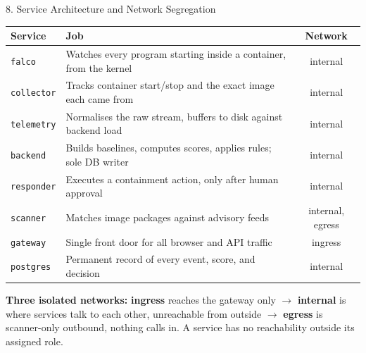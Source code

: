 \documentclass[aspectratio=169, 11pt]{beamer}
\renewcommand{\arraystretch}{1.15}
\begin{document}
\begin{frame}{8. Service Architecture and Network Segregation}
    \scriptsize
    \begin{table}
        \centering
        \renewcommand{\arraystretch}{1.12}
        \setlength{\tabcolsep}{3pt}
        \begin{tabular}{l p{7.6cm} c}
            \toprule
            \textbf{Service} & \textbf{Job} & \textbf{Network} \\
            \midrule
            \texttt{falco} & Watches every program starting inside a container, from the kernel & internal \\
            \texttt{collector} & Tracks container start/stop and the exact image each came from & internal \\
            \texttt{telemetry} & Normalises the raw stream, buffers to disk against backend load & internal \\
            \texttt{backend} & Builds baselines, computes scores, applies rules; sole DB writer & internal \\
            \texttt{responder} & Executes a containment action, only after human approval & internal \\
            \texttt{scanner} & Matches image packages against advisory feeds & internal, egress \\
            \texttt{gateway} & Single front door for all browser and API traffic & ingress \\
            \texttt{postgres} & Permanent record of every event, score, and decision & internal \\
            \bottomrule
        \end{tabular}
    \end{table}
    \vspace{0.1cm}
    \textbf{Three isolated networks:} \textbf{ingress} reaches the gateway only $\to$ \textbf{internal} is where services talk to each other, unreachable from outside $\to$ \textbf{egress} is scanner-only outbound, nothing calls in. A service has no reachability outside its assigned role.
\end{frame}

\end{document}
